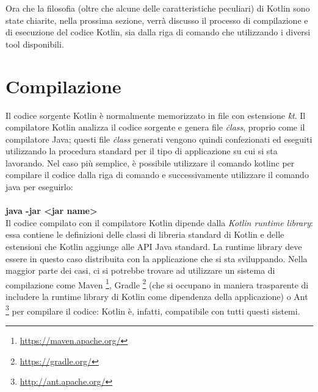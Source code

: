 Ora che la filosofia (oltre che alcune delle caratteristiche peculiari) di Kotlin sono state chiarite, nella prossima sezione, verrà discusso il processo di compilazione e di esecuzione del codice Kotlin, sia dalla riga di comando che utilizzando i diversi tool disponibili.\\


\section{Compilazione}
Il codice sorgente Kotlin è normalmente memorizzato in file con estensione {\em\.kt}. Il compilatore Kotlin analizza il codice sorgente e genera file {\em\.class}, proprio come il compilatore Java; questi file {\em\.class} generati vengono quindi confezionati ed eseguiti utilizzando la procedura standard per il tipo di applicazione su cui si sta lavorando. Nel caso più semplice, è possibile utilizzare il comando {\ttfamily kotlinc} per compilare il codice dalla riga di comando e successivamente utilizzare il comando {\ttfamily java} per eseguirlo:\\

{\bfseries
{}\\
{\ttfamily java -jar <jar name>}
}\\

Il codice compilato con il compilatore Kotlin dipende dalla {\em Kotlin runtime library}: essa contiene le definizioni delle classi di libreria standard di Kotlin e delle estensioni che Kotlin aggiunge alle API Java standard. La runtime library deve essere in questo caso distribuita con la applicazione che si sta sviluppando. Nella maggior parte dei casi, ci si potrebbe trovare ad utilizzare un sistema di compilazione come Maven \footnote{\url{https://maven.apache.org/}}, Gradle \footnote{\url{https://gradle.org/}} (che si occupano in maniera trasparente di includere la runtime library di Kotlin come dipendenza della applicazione) o Ant \footnote{\url{http://ant.apache.org/}} per compilare il codice: Kotlin è, infatti, compatibile con tutti questi sistemi.\\
